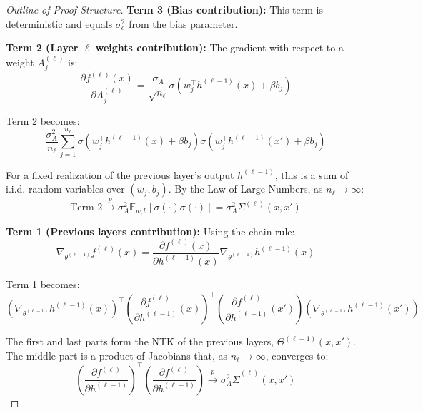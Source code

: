 \documentclass[a4paper]{article}
\theoremstyle{plain}
\theoremstyle{definition}
\theoremstyle{remark}
\begin{document}
\begin{proof}[Outline of Proof Structure]
\textbf{Term 3 (Bias contribution):} This term is deterministic and equals $\sigma_c^2$ from the bias parameter.

\textbf{Term 2 (Layer $\ell$ weights contribution):} The gradient with respect to a weight $A_j^{(\ell)}$ is:
\begin{equation}
\frac{\partial f^{(\ell)}(x)}{\partial A_j^{(\ell)}} = \frac{\sigma_A}{\sqrt{n_\ell}} \sigma(w_j^\top h^{(\ell-1)}(x) + \beta b_j)
\end{equation}

Term 2 becomes:
\begin{equation}
\frac{\sigma_A^2}{n_\ell} \sum_{j=1}^{n_\ell} \sigma(w_j^\top h^{(\ell-1)}(x) + \beta b_j) \sigma(w_j^\top h^{(\ell-1)}(x') + \beta b_j)
\end{equation}

For a fixed realization of the previous layer's output $h^{(\ell-1)}$, this is a sum of i.i.d. random variables over $(w_j, b_j)$. By the Law of Large Numbers, as $n_\ell \to \infty$:
\begin{equation}
\text{Term 2} \xrightarrow{p} \sigma_A^2 \mathbb{E}_{w,b} \left[ \sigma(\cdot) \sigma(\cdot) \right] = \sigma_A^2 \Sigma^{(\ell)}(x, x')
\end{equation}

\textbf{Term 1 (Previous layers contribution):} Using the chain rule:
\begin{equation}
\nabla_{\theta^{(\ell-1)}} f^{(\ell)}(x) = \frac{\partial f^{(\ell)}(x)}{\partial h^{(\ell-1)}(x)} \nabla_{\theta^{(\ell-1)}} h^{(\ell-1)}(x)
\end{equation}

Term 1 becomes:
\begin{equation}
(\nabla_{\theta^{(\ell-1)}} h^{(\ell-1)}(x))^\top \left(\frac{\partial f^{(\ell)}}{\partial h^{(\ell-1)}}(x)\right)^\top \left(\frac{\partial f^{(\ell)}}{\partial h^{(\ell-1)}}(x')\right) (\nabla_{\theta^{(\ell-1)}} h^{(\ell-1)}(x'))
\end{equation}

The first and last parts form the NTK of the previous layers, $\Theta^{(\ell-1)}(x, x')$. The middle part is a product of Jacobians that, as $n_\ell \to \infty$, converges to:
\begin{equation}
\left(\frac{\partial f^{(\ell)}}{\partial h^{(\ell-1)}}\right)^\top \left(\frac{\partial f^{(\ell)}}{\partial h^{(\ell-1)}}\right) \xrightarrow{p} \sigma_A^2 \dot{\Sigma}^{(\ell)}(x, x')
\end{equation}


\end{proof}
\end{document}
